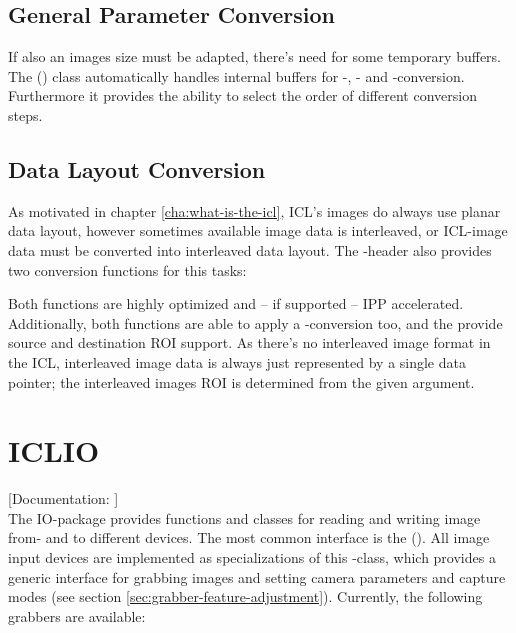 \subsection{General Parameter Conversion}

If also an images size must be adapted, there's need for some temporary buffers. The  () class automatically handles internal buffers for -, - and -conversion. Furthermore it provides the ability to select the order of different conversion steps.
 

 
\subsection{Data Layout Conversion}

As motivated in chapter \ref{cha:what-is-the-icl}, ICL's images do always use planar data layout, however sometimes available image data is interleaved, or ICL-image data must be converted into interleaved data layout. The -header also provides two conversion functions for this tasks: 

Both functions are highly optimized and -- if supported -- IPP accelerated. Additionally, both functions are able to apply a -conversion too, and the provide source and destination ROI support. As there's no interleaved image format in the ICL, interleaved image data is always just represented by a single data pointer; the interleaved images ROI is determined from the given  argument.





\section{ICLIO\label{sec:io}}

[Documentation: ]\\

The IO-package provides functions and classes for reading and writing image from- and to different devices. The most common interface is the  (). All image input devices are implemented as specializations of this -class, which provides a generic interface for grabbing images and setting camera parameters and capture modes (see section \ref{sec:grabber-feature-adjustment}). Currently, the following grabbers are available:

